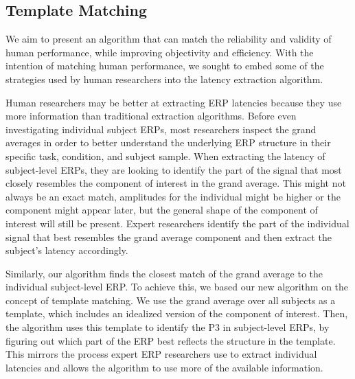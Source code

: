 \documentclass[
  man]{apa7}
\begin{document}
\hypertarget{template-matching}{%
\subsection{Template Matching}\label{template-matching}}

We aim to present an algorithm that can match the reliability and validity of human performance, while improving objectivity and efficiency. With the intention of matching human performance, we sought to embed some of the strategies used by human researchers into the latency extraction algorithm.

Human researchers may be better at extracting ERP latencies because they use more information than traditional extraction algorithms. Before even investigating individual subject ERPs, most researchers inspect the grand averages in order to better understand the underlying ERP structure in their specific task, condition, and subject sample. When extracting the latency of subject-level ERPs, they are looking to identify the part of the signal that most closely resembles the component of interest in the grand average. This might not always be an exact match, amplitudes for the individual might be higher or the component might appear later, but the general shape of the component of interest will still be present. Expert researchers identify the part of the individual signal that best resembles the grand average component and then extract the subject's latency accordingly.

Similarly, our algorithm finds the closest match of the grand average to the individual subject-level ERP. To achieve this, we based our new algorithm on the concept of template matching. We use the grand average over all subjects as a template, which includes an idealized version of the component of interest. Then, the algorithm uses this template to identify the P3 in subject-level ERPs, by figuring out which part of the ERP best reflects the structure in the template. This mirrors the process expert ERP researchers use to extract individual latencies and allows the algorithm to use more of the available information.
\end{document}
